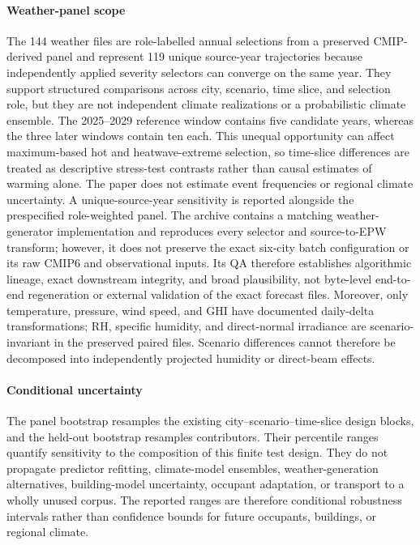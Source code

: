 \paragraph{Weather-panel scope}
The 144 weather files are role-labelled annual selections from a preserved CMIP-derived panel and represent 119 unique source-year trajectories because independently applied severity selectors can converge on the same year. They support structured comparisons across city, scenario, time slice, and selection role, but they are not independent climate realizations or a probabilistic climate ensemble. The 2025--2029 reference window contains five candidate years, whereas the three later windows contain ten each. This unequal opportunity can affect maximum-based hot and heatwave-extreme selection, so time-slice differences are treated as descriptive stress-test contrasts rather than causal estimates of warming alone. The paper does not estimate event frequencies or regional climate uncertainty. A unique-source-year sensitivity is reported alongside the prespecified role-weighted panel. The archive contains a matching weather-generator implementation and reproduces every selector and source-to-EPW transform; however, it does not preserve the exact six-city batch configuration or its raw CMIP6 and observational inputs. Its QA therefore establishes algorithmic lineage, exact downstream integrity, and broad plausibility, not byte-level end-to-end regeneration or external validation of the exact forecast files. Moreover, only temperature, pressure, wind speed, and GHI have documented daily-delta transformations; RH, specific humidity, and direct-normal irradiance are scenario-invariant in the preserved paired files. Scenario differences cannot therefore be decomposed into independently projected humidity or direct-beam effects.

\paragraph{Conditional uncertainty}
The panel bootstrap resamples the existing city--scenario--time-slice design blocks, and the held-out bootstrap resamples contributors. Their percentile ranges quantify sensitivity to the composition of this finite test design. They do not propagate predictor refitting, climate-model ensembles, weather-generation alternatives, building-model uncertainty, occupant adaptation, or transport to a wholly unused corpus. The reported ranges are therefore conditional robustness intervals rather than confidence bounds for future occupants, buildings, or regional climate.

